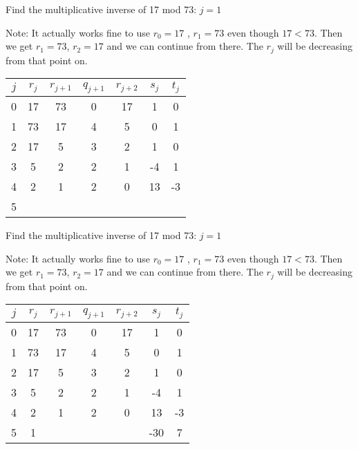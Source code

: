 \documentclass{beamer}
\begin{document}
\begin{frame}{Find the multiplicative inverse of 17 mod 73: $j=1$}

Note: It actually works fine to use $r_0=17$ , $r_1=73$ even though $17<73$.
Then we get $r_1=73$, $r_2=17$ and we can continue from there.
The $r_j$ will be decreasing from that point on.

\vspace{1em}

\begin{tabular}{|c|c|c|c|c|c|c|}\hline
$j$   &  $r_{j}$    & $r_{j+1}$ & $q_{j+1}$ & $r_{j+2}$ & $s_j$ & $t_j$ \\ \hline\hline
0     &  17         &  73       &    0      &   17      &  1    &   0   \\ \hline
1     &  73         &  17       &    4      &    5      &  0    &   1   \\ \hline
2     &  17         &   5       &    3      &    2      &  1    &   0   \\ \hline
3     &   5         &   2       &    2      &    1      & -4    &   1   \\ \hline
4     &   2         &   1       &    2      &    0      & 13    &  -3   \\ \hline
5     &             &           &           &           &       &       \\ \hline
\end{tabular}

\end{frame}

\begin{frame}{Find the multiplicative inverse of 17 mod 73: $j=1$}

Note: It actually works fine to use $r_0=17$ , $r_1=73$ even though $17<73$.
Then we get $r_1=73$, $r_2=17$ and we can continue from there.
The $r_j$ will be decreasing from that point on.

\vspace{1em}

\begin{tabular}{|c|c|c|c|c|c|c|}\hline
$j$   &  $r_{j}$    & $r_{j+1}$ & $q_{j+1}$ & $r_{j+2}$ & $s_j$ & $t_j$ \\ \hline\hline
0     &  17         &  73       &    0      &   17      &  1    &   0   \\ \hline
1     &  73         &  17       &    4      &    5      &  0    &   1   \\ \hline
2     &  17         &   5       &    3      &    2      &  1    &   0   \\ \hline
3     &   5         &   2       &    2      &    1      & -4    &   1   \\ \hline
4     &   2         &   1       &    2      &    0      & 13    &  -3   \\ \hline
5     &   1         &           &           &           &-30    &   7   \\ \hline
\end{tabular}

\end{frame}
\end{document}
